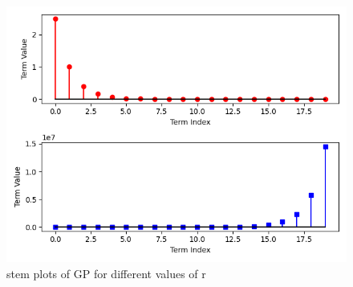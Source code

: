\documentclass[journal,12pt,twocolumn]{IEEEtran}
\theoremstyle{remark}
\begin{document}
\begin{figure}[h!]
    \centering
    \includegraphics[width=\columnwidth]{figs/graph.png}
    \caption{stem plots of GP for different values of r}
    \label{fig:1}
\end{figure}
\end{document}
